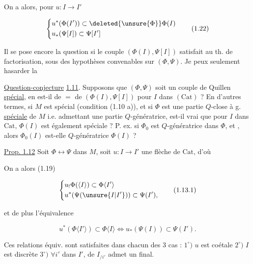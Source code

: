 On a alors, pour $u:I\longrightarrow I'$

\[
\left\{\begin{aligned}
&u^*(\Phi(I'))\subset\deleted{\unsure{\Phi}}\Phi(I)\\
&u_*(\Psi[I])\subset\Psi[I']
\end{aligned}\right.\tag*{(1.22)}
\]

Il se pose encore la question si le couple
$(\Phi(I),\Psi[I])$ satisfait au  th. de factorisation,
sous des hypothèses convenables sur $(\Phi,\Psi)$.
Je peux seulement hasarder la

\uline{Question-conjecture} \uline{1.11}. Supposons que
\deleted{$(\Phi,\unsure{\Psi}$} $(\Phi,\Psi)$ soit un couple de Quillen
\uline{spécial}, en est-il de $=$ de $(\Phi(I),\Psi[I])$
pour  $I$ dans $(\mathrm{Cat})$ ?  En d'autres
termes, si  $M$ est spécial
(condition (1.10 a)), et si $\Phi$ est une
partie $Q$-close à g. \uline{spéciale} de $M$ i.e.
admettant une  partie $Q$-génératrice,
est-il vrai que pour  $I$ dans $\mathrm{Cat}$,
$\Phi(I)$ est également spéciale ?
P. ex. si $\Phi_0$
est $Q$-génératrice dans $\Phi$, et , alors
$\Phi_0(I)$ est-elle $Q$-génératrice  $\Phi(I)$ ?

\uline{Prop. 1.12} Soit $\Phi\longleftrightarrow\Psi$ dans $M$, soit $u:I\longrightarrow I'$
une flèche de $\mathrm{Cat}$, d'où


On a alors (1.19) 

\[
\left\{\begin{aligned}
&u_!\Phi(\langle I\rangle)\subset\Phi\langle I'\rangle\\
&u^*(\Psi(\unsure{I|I'}))\subset\Psi(I'),
\end{aligned}\right.\tag*{(1.13.1)}
\]

et de plus l'équivalence

\[
u^*(\Phi\langle I'\rangle)\subset\Phi\langle I\rangle\Longleftrightarrow
u_*(\Psi(I))\subset\Psi(I').\tag*{(1.13.2)}
\]

Ces relations équiv. sont satisfaites dans chacun des 3 cas :
$1^\circ)$ $u$ est coétale
$2^\circ)$ $I$ est discrète
$3^\circ)$ $\forall i'$ dans $I'$,    de $I_{/i'}$ admet un  final.

